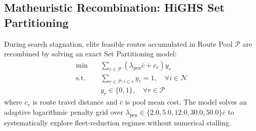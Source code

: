 \subsection{Matheuristic Recombination: HiGHS Set Partitioning}
\label{sec:set_partitioning}

During search stagnation, elite feasible routes accumulated in Route Pool $\mathcal{P}$ are recombined by solving an exact Set Partitioning model:
\begin{align}
  \min \quad &\sum_{r \in \mathcal{P}} \left( \lambda_{\text{pen}} \bar{c} + c_r \right) y_r \label{eq:sp_obj} \\
  \text{s.t.} \quad &\sum_{r \in \mathcal{P} : i \in r} y_r = 1, \quad \forall i \in \mathcal{N} \label{eq:sp_cover} \\
  &y_r \in \{0, 1\}, \quad \forall r \in \mathcal{P} \label{eq:sp_binary}
\end{align}
where $c_r$ is route travel distance and $\bar{c}$ is pool mean cost. The model solves an adaptive logarithmic penalty grid over $\lambda_{\text{pen}} \in \{2.0, 5.0, 12.0, 30.0, 50.0\}\bar{c}$ to systematically explore fleet-reduction regimes without numerical stalling.

